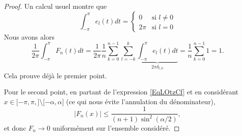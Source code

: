 \begin{proof}
	Un calcul usuel montre que
	\begin{equation}
		\int_{-\pi}^{\pi}e_l(t)dt=\begin{cases}
			0    & \text{si } l\neq 0 \\
			2\pi & \text{si } l=0
		\end{cases}
	\end{equation}
	Nous avons alors
	\begin{equation}
		\frac{1}{ 2\pi }\int_{-\pi}^{\pi}F_n(t)dt=\frac{1}{ 2\pi }\frac{1}{ n }\sum_{k=0}^{n-1}\sum_{l=-k}^k\underbrace{\int_{-\pi}^{\pi}e_l(t)dt}_{2\pi\delta_{l,0}}=\frac{1}{ n }\sum_{k=0}^{n-1}1=1.
	\end{equation}
	Cela prouve déjà le premier point.

	Pour le second point, en partant de l'expression \eqref{EqLOtzCf} et en considérant \( x\in\mathopen[ -\pi, \pi ,  \mathclose]\setminus\mathopen[ -\alpha , \alpha \mathclose]\) (ce qui nous évite l'annulation du dénominateur),
	\begin{equation}
		| F_n(x) |\leq\frac{1}{ (n+1)\sin^2(\alpha/2) },
	\end{equation}
	et donc \( F_n\to 0\) uniformément sur l'ensemble considéré.


\end{proof}
